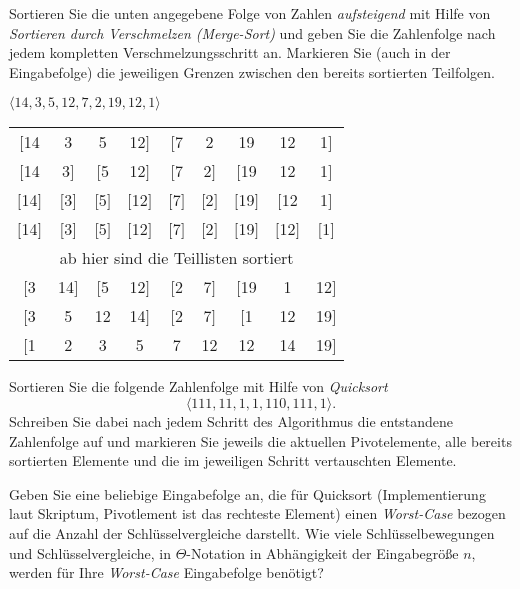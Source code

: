 \documentclass[a4paper, 12pt]{article}
\begin{document}




\begin{angabe}
Sortieren Sie die unten angegebene Folge von Zahlen \emph{aufsteigend} mit
Hilfe von \emph{Sortieren durch Verschmelzen (Merge-Sort)} und geben Sie die
Zahlenfolge nach jedem kompletten Verschmelzungsschritt an. Markieren Sie (auch
in der Eingabefolge) die jeweiligen Grenzen zwischen den bereits sortierten
Teilfolgen.

\begin{center}
$\langle 14, 3, 5, 12, 7, 2, 19, 12, 1 \rangle $
\end{center}


\end{angabe}

\begin{tabular}{ c  c   c  c  c  c  c  c  c }
$[$14 & 3 & 5 & 12$]$ & $[$7 & 2 & 19 & 12 & 1$]$ \\
$[$14 & 3$]$ & $[$5 & 12$]$ & $[$7 & 2$]$ & $[$19 & 12 & 1$]$ \\
$[$14$]$ & $[$3$]$ & $[$5$]$ & $[$12$]$ & $[$7$]$ & $[$2$]$ & $[$19$]$ & $[$12 & 1$]$ \\
$[$14$]$ & $[$3$]$ & $[$5$]$ & $[$12$]$ & $[$7$]$ & $[$2$]$ & $[$19$]$ & $[$12$]$ & $[$1$]$ \\
 \multicolumn{9}{c}{  ab hier sind die Teillisten sortiert} \\
$[$3 & 14$]$ & $[$5 & 12$]$ & $[$2 & 7$]$ & $[$19 & 1 & 12$]$  \\ 
$[$3 & 5 & 12 & 14$]$ & $[$2 & 7$]$ & $[$1 & 12 & 19$]$ \\
$[$1 & 2 & 3 & 5 & 7 & 12 & 12 & 14 & 19$]$ \\
\end{tabular}






\begin{angabe}
Sortieren Sie die folgende Zahlenfolge mit Hilfe von \textit{Quicksort}
\[
\langle 111, 11, 1, 1, 110, 111, 1  \rangle.
\]
Schreiben Sie dabei nach jedem Schritt des Algorithmus die entstandene
Zahlenfolge auf und markieren Sie jeweils die aktuellen Pivotelemente,
alle bereits sortierten Elemente und die im jeweiligen Schritt
vertauschten Elemente.

Geben Sie eine beliebige Eingabefolge an, die für Quicksort
(Implementierung laut Skriptum, Pivotlement ist das rechteste Element) 
einen \emph{Worst-Case} bezogen auf die
Anzahl der Schlüsselvergleiche darstellt.  Wie viele Schlüsselbewegungen
und Schlüsselvergleiche, in $\Theta$-Notation in Abhängigkeit der
Eingabegröße $n$, werden für Ihre \emph{Worst-Case} Eingabefolge benötigt?



\end{angabe}
\end{document}
